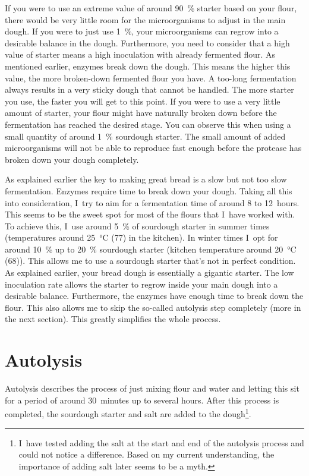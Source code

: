 If you were to use an extreme value of around \qty{90}{\percent} starter based on your flour, there
would be very little room for the microorganisms to adjust in the main dough.
If you were to just use \qty{1}{\percent}, your microorganisms can regrow into a
desirable balance in the dough. Furthermore, you need to consider that a high value
of starter means a high inoculation with already fermented flour. As
mentioned earlier, enzymes break down the dough. This means the higher this
value, the more broken-down fermented flour you have. A too-long fermentation
always results in a very sticky dough that cannot be handled. The more
starter you use, the faster you will get to this point. If you were to use a
very little amount of starter, your flour might have naturally broken down
before the fermentation has reached the desired stage. You can observe this
when using a small quantity of around \qty{1}{\percent} sourdough starter. The small
amount of added microorganisms will not be able to reproduce fast enough
before the protease has broken down your dough completely.

As explained earlier the key to making great bread is a slow but not too slow
fermentation. Enzymes require time to break down your dough. Taking all this
into consideration, I~try to aim for a fermentation time of around 8 to 12~hours. This seems to be
the sweet spot for most of the flours that I~have worked with. To achieve this,
I~use around \qty{5}{\percent} of sourdough starter in summer times
(temperatures around \qty{25}{\degreeCelsius} (\qty{77}{\degF}) in the
kitchen). In winter times I~opt for around \qty{10}{\percent} up to
\qty{20}{\percent} sourdough starter (kitchen temperature around
\qty{20}{\degreeCelsius} (\qty{68}{\degF})). This
allows me to use a sourdough starter that's not in perfect condition. As
explained earlier, your
bread dough is essentially a gigantic starter. The low inoculation rate allows
the starter to regrow inside your main dough into a desirable balance.
Furthermore, the enzymes have enough time to break down the flour. This also
allows me to skip the so-called autolysis step completely (more in the next section).
This greatly simplifies the whole process.

\section{Autolysis}%
\label{sec:autolysis}

Autolysis describes the process of just mixing flour and water and letting
this sit for a period of around 30~minutes up to several hours. After this
process is completed, the sourdough starter and salt are added to the
dough\footnote{I~have tested adding the salt at the start and end of the
autolysis process and could not notice a difference. Based on my current
understanding, the importance of adding salt later seems to be a myth.}.

